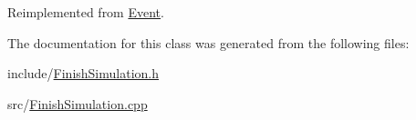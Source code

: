 Reimplemented from \hyperlink{class_event_abf16ed4a9c78514c704ce2de6a2b9ec7}{Event}.



The documentation for this class was generated from the following files\+:\begin{DoxyCompactItemize}
\item 
include/\hyperlink{_finish_simulation_8h}{Finish\+Simulation.\+h}\item 
src/\hyperlink{_finish_simulation_8cpp}{Finish\+Simulation.\+cpp}\end{DoxyCompactItemize}
